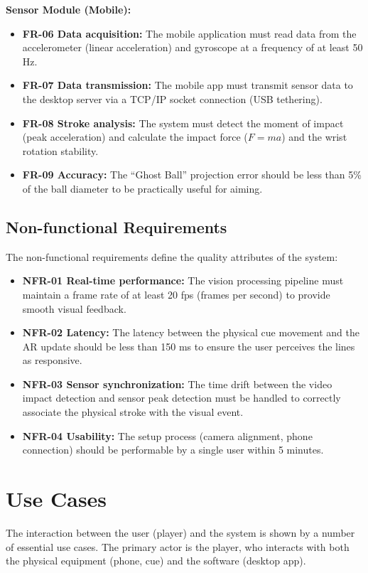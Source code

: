 \textbf{Sensor Module (Mobile):}
\begin{itemize}
    \item \textbf{FR-06 Data acquisition:} The mobile application must read data from the accelerometer (linear acceleration) and gyroscope at a frequency of at least 50 Hz.
    \item \textbf{FR-07 Data transmission:} The mobile app must transmit sensor data to the desktop server via a TCP/IP socket connection (USB tethering).
    \item \textbf{FR-08 Stroke analysis:} The system must detect the moment of impact (peak acceleration) and calculate the impact force ($F=ma$) and the wrist rotation stability.
    \item \textbf{FR-09 Accuracy:} The ``Ghost Ball'' projection error should be less than 5\% of the ball diameter to be practically useful for aiming.
\end{itemize}

\subsection{Non-functional Requirements}
The non-functional requirements define the quality attributes of the system:

\begin{itemize}
    \item \textbf{NFR-01 Real-time performance:} The vision processing pipeline must maintain a frame rate of at least 20 fps (frames per second) to provide smooth visual feedback.
    \item \textbf{NFR-02 Latency:} The latency between the physical cue movement and the AR update should be less than 150 ms to ensure the user perceives the lines as responsive.
    \item \textbf{NFR-03 Sensor synchronization:} The time drift between the video impact detection and sensor peak detection must be handled to correctly associate the physical stroke with the visual event.
    \item \textbf{NFR-04 Usability:} The setup process (camera alignment, phone connection) should be performable by a single user within 5 minutes.
\end{itemize}

\section{Use Cases}

The interaction between the user (player) and the system is shown by a number of essential use cases. The primary actor is the player, who interacts with both the physical equipment (phone, cue) and the software (desktop app).

